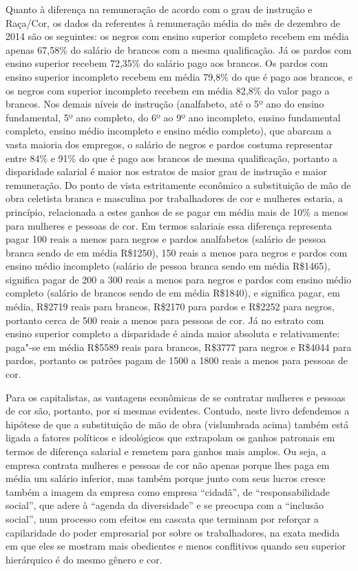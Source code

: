 Quanto à diferença na remuneração de acordo com o grau de instrução e
Raça/Cor, os dados da  referentes à remuneração média do mês de
dezembro de 2014 são os seguintes: os negros com ensino superior
completo recebem em média apenas 67,58\% do salário de brancos com a
mesma qualificação. Já os pardos com ensino superior recebem 72,35\% do
salário pago aos brancos. Os pardos com ensino superior incompleto
recebem em média 79,8\% do que é pago aos brancos, e os negros com
superior incompleto recebem em média 82,8\% do valor pago a brancos. Nos
demais níveis de instrução (analfabeto, até o 5º ano do ensino
fundamental, 5º ano completo, do 6º ao 9º ano incompleto, ensino
fundamental completo, ensino médio incompleto e ensino médio completo),
que abarcam a vasta maioria dos empregos, o salário de negros e pardos
costuma representar entre 84\% e 91\% do que é pago aos brancos de mesma
qualificação, portanto a disparidade salarial é maior nos estratos de
maior grau de instrução e maior remuneração. Do ponto de vista
estritamente econômico a substituição de mão de obra celetista branca e
masculina por trabalhadores de cor e mulheres estaria, a princípio,
relacionada a estes ganhos de se pagar em média mais de 10\% a menos
para mulheres e pessoas de cor. Em termos salariais essa diferença
representa pagar 100 reais a menos para negros e pardos analfabetos
(salário de pessoa branca sendo de em média R\$1250), 150 reais a menos
para negros e pardos com ensino médio incompleto (salário de pessoa
branca sendo em média R\$1465), significa pagar de 200 a 300 reais a
menos para negros e pardos com ensino médio completo (salário de brancos
sendo de em média R\$1840), e significa pagar, em média, R\$2719 reais
para brancos, R\$2170 para pardos e R\$2252 para negros, portanto cerca
de 500 reais a menos para pessoas de cor. Já no estrato com ensino
superior completo a disparidade é ainda maior absoluta e relativamente:
paga"-se em média R\$5589 reais para brancos, R\$3777 para negros e
R\$4044 para pardos, portanto os patrões pagam de 1500 a 1800 reais a
menos para pessoas de cor.

Para os capitalistas, as vantagens econômicas de se contratar mulheres e
pessoas de cor são, portanto, por si mesmas evidentes. Contudo, neste
livro defendemos a hipótese de que a substituição de mão de obra
(vislumbrada acima) também está ligada a fatores políticos e ideológicos
que extrapolam os ganhos patronais em termos de diferença salarial e
remetem para ganhos mais amplos. Ou seja, a empresa contrata mulheres e
pessoas de cor não apenas porque lhes paga em média um salário inferior,
mas também porque junto com seus lucros cresce também a imagem da
empresa como empresa ``cidadã'', de ``responsabilidade social'', que
adere à ``agenda da diversidade'' e se preocupa com a ``inclusão
social'', num processo com efeitos em cascata que terminam por reforçar
a capilaridade do poder empresarial por sobre os trabalhadores, na exata
medida em que eles se mostram mais obedientes e menos conflitivos quando
seu superior hierárquico é do mesmo gênero e cor.

